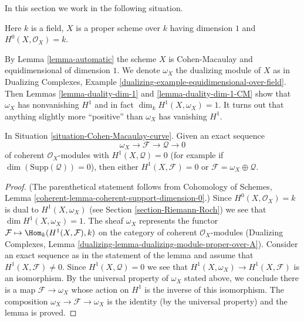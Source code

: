 \noindent
In this section we work in the following situation.

\begin{situation}
\label{situation-Cohen-Macaulay-curve}
Here $k$ is a field, $X$ is a proper scheme over $k$ having dimension $1$
and $H^0(X, \mathcal{O}_X) = k$.
\end{situation}

\noindent
By Lemma \ref{lemma-automatic} the scheme $X$ is Cohen-Macaulay and
equidimensional of dimension $1$. We denote $\omega_X$ the dualizing module
of $X$ as in Dualizing Complexes, Example
\ref{dualizing-example-equidimensional-over-field}.
Then Lemmas \ref{lemma-duality-dim-1} and \ref{lemma-duality-dim-1-CM}
show that $\omega_X$ has nonvanishing $H^1$ and in fact
$\dim_k H^1(X, \omega_X) = 1$. It turns out
that anything slightly more ``positive'' than $\omega_X$ has vanishing $H^1$.

\begin{lemma}
\label{lemma-vanishing}
In Situation \ref{situation-Cohen-Macaulay-curve}. Given an exact sequence
$$
\omega_X \to \mathcal{F} \to \mathcal{Q} \to 0
$$
of coherent $\mathcal{O}_X$-modules with $H^1(X, \mathcal{Q}) = 0$
(for example if $\dim(\text{Supp}(\mathcal{Q})) = 0$), then
either $H^1(X, \mathcal{F}) = 0$ or
$\mathcal{F} = \omega_X \oplus \mathcal{Q}$.
\end{lemma}

\begin{proof}
(The parenthetical statement follows from
Cohomology of Schemes, Lemma \ref{coherent-lemma-coherent-support-dimension-0}.)
Since $H^0(X, \mathcal{O}_X) = k$ is dual to $H^1(X, \omega_X)$
(see Section \ref{section-Riemann-Roch})
we see that $\dim H^1(X, \omega_X) = 1$. The sheaf $\omega_X$
represents the functor
$\mathcal{F} \mapsto \Hom_k(H^1(X, \mathcal{F}), k)$
on the category of coherent $\mathcal{O}_X$-modules
(Dualizing Complexes, Lemma
\ref{dualizing-lemma-dualizing-module-proper-over-A}).
Consider an exact sequence as in the statement of the lemma
and assume that $H^1(X, \mathcal{F}) \not = 0$. Since
$H^1(X, \mathcal{Q}) = 0$ we see that
$H^1(X, \omega_X) \to H^1(X, \mathcal{F})$ is an isomorphism.
By the universal property of $\omega_X$ stated above, we conclude there
is a map $\mathcal{F} \to \omega_X$ whose action on $H^1$ is the inverse
of this isomorphism. The composition $\omega_X \to \mathcal{F} \to \omega_X$
is the identity (by the universal property) and the lemma is proved.
\end{proof}

